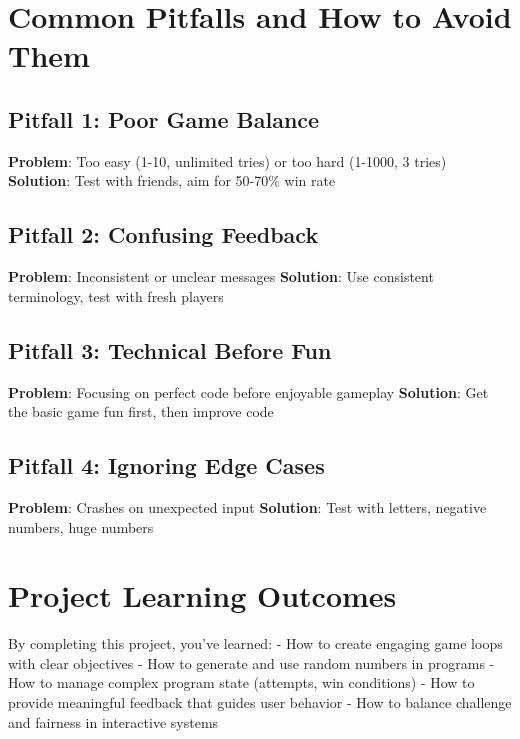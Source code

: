 \documentclass[
  letterpaper,
  DIV=11,
  numbers=noendperiod,
  oneside]{scrreprt}
\begin{document}
\section{Common Pitfalls and How to Avoid
Them}\label{common-pitfalls-and-how-to-avoid-them-2}

\subsection{Pitfall 1: Poor Game
Balance}\label{pitfall-1-poor-game-balance}

\textbf{Problem}: Too easy (1-10, unlimited tries) or too hard (1-1000,
3 tries) \textbf{Solution}: Test with friends, aim for 50-70\% win rate

\subsection{Pitfall 2: Confusing
Feedback}\label{pitfall-2-confusing-feedback}

\textbf{Problem}: Inconsistent or unclear messages \textbf{Solution}:
Use consistent terminology, test with fresh players

\subsection{Pitfall 3: Technical Before
Fun}\label{pitfall-3-technical-before-fun}

\textbf{Problem}: Focusing on perfect code before enjoyable gameplay
\textbf{Solution}: Get the basic game fun first, then improve code

\subsection{Pitfall 4: Ignoring Edge
Cases}\label{pitfall-4-ignoring-edge-cases}

\textbf{Problem}: Crashes on unexpected input \textbf{Solution}: Test
with letters, negative numbers, huge numbers

\section{Project Learning Outcomes}\label{project-learning-outcomes-2}

By completing this project, you've learned: - How to create engaging
game loops with clear objectives - How to generate and use random
numbers in programs - How to manage complex program state (attempts, win
conditions) - How to provide meaningful feedback that guides user
behavior - How to balance challenge and fairness in interactive systems
\end{document}
